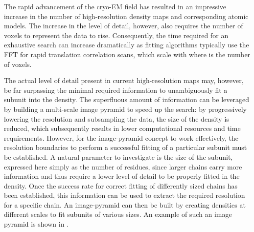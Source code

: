 The rapid advancement of the cryo-EM field has resulted in an impressive
increase in the number of high-resolution density maps and corresponding atomic
models. The increase in the level of detail, however, also requires the number
of voxels to represent the data to rise. Consequently, the time required for an
exhaustive search can increase dramatically as fitting algorithms typically use
the FFT for rapid translation correlation scans, which scale with  where
 is the number of voxels. 

The actual level of detail present in current high-resolution maps may,
however, be far surpassing the minimal required information to unambiguously
fit a subunit into the density. The superfluous amount of information can be
leveraged by building a multi-scale image pyramid to speed up the search: by
progressively lowering the resolution and subsampling the data, the size of the
density is reduced, which subsequently results in lower computational resources
and time requirements. However, for the image-pyramid concept to work
effectively, the resolution boundaries to perform a successful fitting of a
particular subunit must be established. A natural parameter to investigate is
the size of the subunit, expressed here simply as the number of residues, since
larger chains carry more information and thus require a lower level of detail
to be properly fitted in the density. Once the success rate for correct fitting
of differently sized chains has been established, this information can be used
to extract the required resolution for a specific chain. An image-pyramid can
then be built by creating densities at different scales to fit subunits of
various sizes. An example of such an image pyramid is shown in
.

{}

